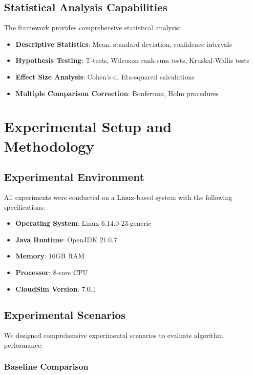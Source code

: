 \documentclass[conference]{IEEEtran}
\begin{document}
\subsection{Statistical Analysis Capabilities}

The framework provides comprehensive statistical analysis:

\begin{itemize}
    \item \textbf{Descriptive Statistics}: Mean, standard deviation, confidence intervals
    \item \textbf{Hypothesis Testing}: T-tests, Wilcoxon rank-sum tests, Kruskal-Wallis tests
    \item \textbf{Effect Size Analysis}: Cohen's d, Eta-squared calculations
    \item \textbf{Multiple Comparison Correction}: Bonferroni, Holm procedures
\end{itemize}

\section{Experimental Setup and Methodology}

\subsection{Experimental Environment}

All experiments were conducted on a Linux-based system with the following specifications:
\begin{itemize}
    \item \textbf{Operating System}: Linux 6.14.0-23-generic
    \item \textbf{Java Runtime}: OpenJDK 21.0.7
    \item \textbf{Memory}: 16GB RAM
    \item \textbf{Processor}: 8-core CPU
    \item \textbf{CloudSim Version}: 7.0.1
\end{itemize}

\subsection{Experimental Scenarios}

We designed comprehensive experimental scenarios to evaluate algorithm performance:

\subsubsection{Baseline Comparison}
\end{document}

